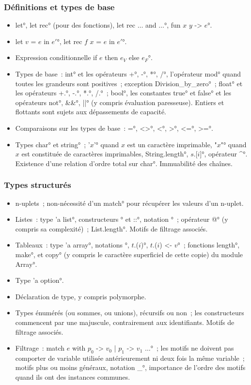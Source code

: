 \subsubsection*{Définitions et types de base}
\begin{itemize}
\item \°let°, \°let rec° (pour des fonctions), \°let rec $\dots$ and $\dots$°, \°fun $x$ $y$ -> $e$°.
\item \°let $v$ = $e$ in $e'$°, \°let rec $f$ $x$ = $e$ in $e'$°.
\item Expression conditionnelle \°if $e$ then $e_V$ else $e_F$°.
\item 
Types de base~: \°int° et les opérateurs \°+°, \°-°, \°*°, \°/°, l'opérateur \°mod° quand toutes les grandeurs sont positives~;
exception \°Division_by_zero°~; \°float° et les opérateurs \°+.°, \°-.°, \°*.°, \°/.°~; \°bool°, les constantes \°true° et \°false° et les opérateurs \°not°, \°&&°, \°||° (y compris évaluation paresseuse). Entiers et flottants sont sujets aux dépassements de capacité.
\item Comparaisons sur les types de base~: \°=°, \°<>°, \°<°, \°>°, \°<=°, \°>=°.
\item Types \°char° et \°string°~; \°'$x$'° quand $x$ est un caractère imprimable, \°"$x$"° quand $x$ est constituée de caractères imprimables, \°String.length°, \°$s$.[$i$]°, opérateur \°^°. Existence d'une relation d'ordre total sur \°char°. Immuabilité des chaînes.
\end{itemize}

\subsubsection*{Types structurés}
\begin{itemize}
\item n-uplets~; non-nécessité d'un \°match° pour récupérer les valeurs d'un n-uplet.
\item Listes~: type \°'a list°, constructeurs \°[]° et \°::°, notation \°[$x$; $y$; $z$]°~; opérateur \°@° (y compris sa complexité)~; \°List.length°. Motifs de filtrage associés.
\item {}
Tableaux~: type \°'a array°, notations \°[|$\dots$|]°, \°$t$.($i$)°, \°$t$.($i$) <- $v$°~; fonctions \°length°, \°make°, et \°copy° (y compris le caractère superficiel de cette copie) du module \°Array°.
\item Type \°'a option°.
\item Déclaration de type, y compris polymorphe.
\item Types énumérés (ou sommes, ou unions), récursifs ou non~; les constructeurs commencent par une majuscule, contrairement aux identifiants. Motifs de filtrage associés.
\item Filtrage~: \°match $e$ with $p_0$ -> $v_0$ | $p_1$ -> $v_1$ $\dots$°~; les motifs ne doivent pas comporter de variable utilisée antérieurement ni deux fois la même variable~; motifs plus ou moins généraux, notation \°_°, importance de l'ordre des motifs quand ils ont des instances communes.
\end{itemize}

